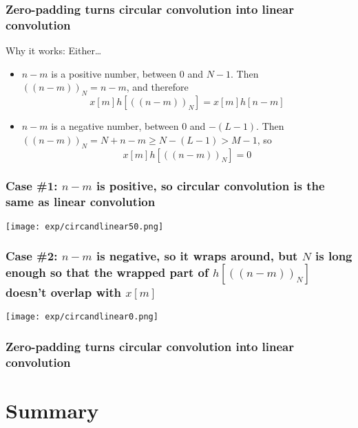 \documentclass{beamer}
\begin{document}
\begin{frame}
  \frametitle{Zero-padding turns circular convolution into linear convolution}

  Why it works:  Either\ldots
  \begin{itemize}
  \item $n-m$ is a positive number, between $0$ and $N-1$.  Then
    $(\!(n-m)\!)_N=n-m$, and therefore
    \begin{displaymath}
      x[m]h\left[(\!(n-m)\!)_N\right]=x[m]h[n-m]
    \end{displaymath}
  \item $n-m$ is a negative number, between $0$ and $-(L-1)$.  Then
    $(\!(n-m)\!)_N=N+n-m\ge N-(L-1)>M-1$, so
    \begin{displaymath}
      x[m]h\left[(\!(n-m)\!)_N\right]=0
    \end{displaymath}
  \end{itemize}
\end{frame}
  
\begin{frame}
  \frametitle{Case \#1: $n-m$ is positive, so circular
    convolution is the same as linear convolution}

  \centerline{\texttt{[image: exp/circandlinear50.png]}}
\end{frame}
  
\begin{frame}
  \frametitle{Case \#2: $n-m$ is negative, so it wraps around, but $N$
    is long enough so that the wrapped part of
    $h\left[(\!(n-m)\!)_N\right]$ doesn't overlap with $x[m]$}
  
  \centerline{\texttt{[image: exp/circandlinear0.png]}}
\end{frame}
  
\begin{frame}
  \frametitle{Zero-padding turns circular convolution into linear convolution}

  \centerline{}
\end{frame}



\section[Summary]{Summary}
\setcounter{subsection}{1}
\end{document}
